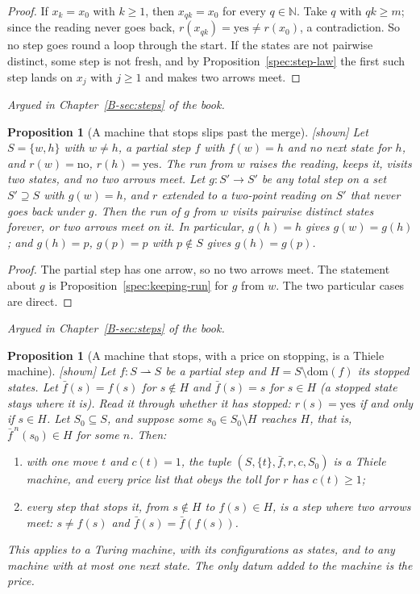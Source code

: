 \documentclass[11pt, a4paper]{article}
\theoremstyle{plain}
\newtheorem{proposition}[theorem]{Proposition}
\theoremstyle{definition}
\theoremstyle{remark}
\newcommand{\N}{\mathbb{N}}
\newcommand{\cost}{c}
\newcommand{\rd}{r}
\newcommand{\argued}[1]{\par\noindent\textit{Argued in Chapter~\ref{B-#1} of the book.}\par}
\newcommand{\kind}[1]{\textup{[#1]}}
\begin{document}
\begin{proof}
If $x_k=x_0$ with $k\ge1$, then $x_{qk}=x_0$ for every $q\in\N$. Take $q$ with $qk\ge m$; since the
reading never goes back, $\rd(x_{qk})=\mathrm{yes}\ne\rd(x_0)$, a contradiction. So no step goes round
a loop through the start. If the states are not pairwise distinct, some step is not fresh, and by
Proposition~\ref{spec:step-law} the first such step lands on $x_j$ with $j\ge1$ and makes two arrows
meet.
\end{proof}

\argued{sec:steps}

\begin{proposition}[A machine that stops slips past the merge]\label{spec:stop-slips} \kind{shown}
Let $S=\{w,h\}$ with $w\ne h$, a partial step $f$ with $f(w)=h$ and no next state for $h$, and
$\rd(w)=\mathrm{no}$, $\rd(h)=\mathrm{yes}$. The run from $w$ raises the reading, keeps it, visits two
states, and no two arrows meet. Let $g:S'\to S'$ be any total step on a set $S'\supseteq S$ with
$g(w)=h$, and $\rd$ extended to a two-point reading on $S'$ that never goes back under $g$. Then the
run of $g$ from $w$ visits pairwise distinct states forever, or two arrows meet on it. In particular,
$g(h)=h$ gives $g(w)=g(h)$; and $g(h)=p$, $g(p)=p$ with $p\notin S$ gives $g(h)=g(p)$.
\end{proposition}

\begin{proof}
The partial step has one arrow, so no two arrows meet. The statement about $g$ is
Proposition~\ref{spec:keeping-run} for $g$ from $w$. The two particular cases are direct.
\end{proof}

\argued{sec:steps}

\begin{proposition}[A machine that stops, with a price on stopping, is a Thiele machine]\label{spec:stopped-reading}
\kind{shown}
Let $f:S\rightharpoonup S$ be a partial step and $H=S\setminus\mathrm{dom}(f)$ its stopped states.
Let $\bar f(s)=f(s)$ for $s\notin H$ and $\bar f(s)=s$ for $s\in H$ (a stopped state stays where it
is). Read it through whether it has stopped: $\rd(s)=\mathrm{yes}$ if and only if $s\in H$. Let
$S_0\subseteq S$, and suppose some $s_0\in S_0\setminus H$ reaches $H$, that is, $\bar f^{\,n}(s_0)\in H$
for some $n$. Then:
\begin{enumerate}[label=(\alph*)]
\item with one move $t$ and $\cost(t)=1$, the tuple $(S,\{t\},\bar f,\rd,\cost,S_0)$ is a Thiele
machine, and every price list that obeys the toll for $\rd$ has $\cost(t)\ge1$;
\item every step that stops it, from $s\notin H$ to $f(s)\in H$, is a step where two arrows meet:
$s\ne f(s)$ and $\bar f(s)=\bar f(f(s))$.
\end{enumerate}
This applies to a Turing machine, with its configurations as states, and to any machine with at most
one next state. The only datum added to the machine is the price.
\end{proposition}
\end{document}
